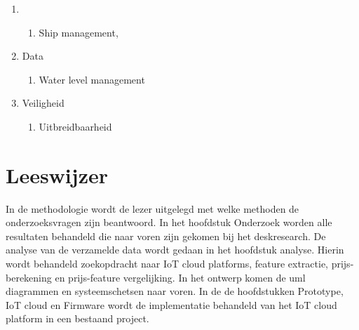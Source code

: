 \begin{enumerate}
	\item  
	\begin{enumerate}
		\item Ship management,  
	\end{enumerate}
	\item Data
	\begin{enumerate}
		\item Water level management
	\end{enumerate}
	\item Veiligheid     
	\begin{enumerate}
		\item Uitbreidbaarheid     
	\end{enumerate}
	
	
\end{enumerate}




\section{Leeswijzer}
In  de methodologie wordt de lezer uitgelegd met welke methoden de onderzoeksvragen zijn beantwoord. In het hoofdstuk Onderzoek worden alle resultaten behandeld die naar voren zijn gekomen bij het deskresearch. De analyse van de verzamelde data wordt gedaan in het hoofdstuk analyse. Hierin wordt behandeld zoekopdracht naar IoT cloud platforms, feature extractie, prijs-berekening en prijs-feature vergelijking. In het ontwerp komen de uml diagrammen en systeemschetsen naar voren. In de  de hoofdstukken Prototype, IoT cloud en Firmware wordt de implementatie behandeld van het IoT cloud platform in een bestaand project.





